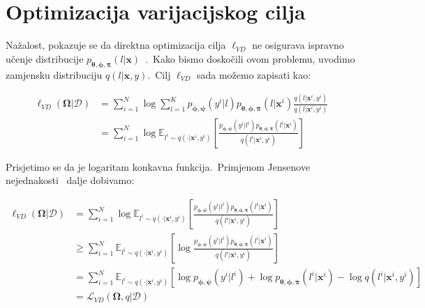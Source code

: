 \documentclass[diplomskirad]{fer}
\begin{document}
\section{Optimizacija varijacijskog cilja}
\label{sek:var_cilj}

Nažalost, pokazuje se da direktna optimizacija cilja $\ell_{VD}$ ne osigurava ispravno učenje distribucije $p_{\bm{\theta}, \bm{\phi}, \bm{\pi}}(l | \bm{x})$~\cite{mclachlan2008algorithm}.\ 
Kako bismo doskočili ovom problemu, uvodimo zamjensku distribuciju $q(l | \bm{x}, y)$.\ Cilj $\ell_{VD}$ sada možemo zapisati kao:

\begin{equation}
  \begin{aligned}
    \ell_{VD}(\bm{\Omega}|\mathcal{D}) &= \sum_{i=1}^{N} \log \sum_{l=1}^{K} p_{\bm{\phi}, \bm{\psi}}(y^i | l) p_{\bm{\theta}, \bm{\phi}, \bm{\pi}}(l | \bm{x}^i) \frac{q(l | \bm{x}^i, y^i)}{q(l | \bm{x}^i, y^i)} \\
                                 &= \sum_{i=1}^{N} \log \mathbb{E}_{l^i \sim q(\cdot | \bm{x}^i, y^i)} \left[ \frac{p_{\bm{\phi}, \bm{\psi}}(y^i | l^i) p_{\bm{\theta}, \bm{\phi}, \bm{\pi}}(l^i | \bm{x}^i)}{q(l^i | \bm{x}^i, y^i)} \right]
  \end{aligned}
  \label{eq:vibe_added_q}
\end{equation}

Prisjetimo se da je logaritam konkavna funkcija.\ Primjenom Jensenove nejednakosti~\cite{mcshane1937jensen} dalje dobivamo:

\begin{equation}
  \begin{aligned}
    \ell_{VD}(\bm{\Omega}|\mathcal{D}) &= \sum_{i=1}^{N} \log \mathbb{E}_{l^i \sim q(\cdot | \bm{x}^i, y^i)} \left[ \frac{p_{\bm{\phi}, \bm{\psi}}(y^i | l^i) p_{\bm{\theta}, \bm{\phi}, \bm{\pi}}(l^i | \bm{x}^i)}{q(l^i | \bm{x}^i, y^i)} \right] \\
                                 &\geq \sum_{i=1}^{N} \mathbb{E}_{l^i \sim q(\cdot | \bm{x}^i, y^i)} \left[\log \frac{p_{\bm{\phi}, \bm{\psi}}(y^i | l^i) p_{\bm{\theta}, \bm{\phi}, \bm{\pi}}(l^i | \bm{x}^i)}{q(l^i | \bm{x}^i, y^i)} \right] \\
                                 &= \sum_{i=1}^{N} \mathbb{E}_{l^i \sim q(\cdot | \bm{x}^i, y^i)} \left[\log p_{\bm{\phi}, \bm{\psi}}(y^i | l^i) + \log p_{\bm{\theta}, \bm{\phi}, \bm{\pi}}(l^i | \bm{x}^i) - \log q(l^i | \bm{x}^i, y^i) \right] \\
                                 &= \mathcal{L}_{VD}(\bm{\Omega}, q | \mathcal{D})
  \end{aligned}
  \label{eq:vibe_jensen}
\end{equation}
\end{document}
